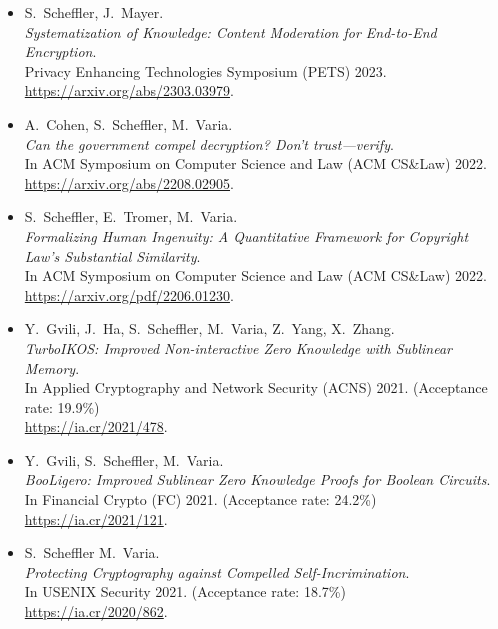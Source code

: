 \documentclass{res}
\begin{document}
\begin{resume}
\begin{itemize}
\item[\eeesok] S.~Scheffler, J.~Mayer. \\
\emph{Systematization of Knowledge: Content Moderation for End-to-End Encryption}. \\
Privacy Enhancing Technologies Symposium (PETS) 2023. \\
\url{https://arxiv.org/abs/2303.03979}.

\item[\foregoneVerif] A.~Cohen, S.~Scheffler, M.~Varia. \\
\emph{Can the government compel decryption?  Don't trust---verify}. \\
In ACM Symposium on Computer Science and Law (ACM CS\&Law) 2022. \\
\url{https://arxiv.org/abs/2208.02905}.

\item[\copyrightMDL] S.~Scheffler, E.~Tromer, M.~Varia. \\
\emph{Formalizing Human Ingenuity: A Quantitative Framework for Copyright Law's Substantial Similarity}. \\
In ACM Symposium on Computer Science and Law (ACM CS\&Law) 2022. \\
\url{https://arxiv.org/pdf/2206.01230}.

\item[\turboikos] Y.~Gvili, J.~Ha, S.~Scheffler, M.~Varia, Z.~Yang, X.~Zhang. \\
\emph{TurboIKOS: Improved Non-interactive Zero Knowledge with Sublinear Memory}. \\
In Applied Cryptography and Network Security (ACNS) 2021. (Acceptance rate: 19.9\%) \\
\url{https://ia.cr/2021/478}.

\item[\booligero] Y.~Gvili, S.~Scheffler, M.~Varia. \\
\emph{BooLigero: Improved Sublinear Zero Knowledge Proofs for Boolean Circuits}. \\
In Financial Crypto (FC) 2021.  (Acceptance rate: 24.2\%) \\
\url{https://ia.cr/2021/121}.

\item[\foregoneconclusion] S.~Scheffler M.~Varia. \\
\emph{Protecting Cryptography against Compelled Self-Incrimination}. \\
In USENIX Security 2021. (Acceptance rate: 18.7\%)\\
\url{https://ia.cr/2020/862}.


\end{itemize}
\end{resume}
\end{document}
